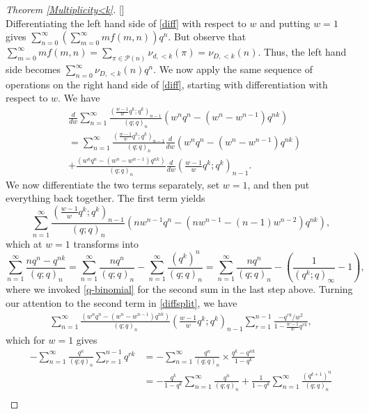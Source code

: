 \documentclass[12pt,reqno]{amsart}
\renewcommand{\(}{\left\(}
\renewcommand{\)}{\right\)}
\renewcommand{\[}{\left\[}
\renewcommand{\]}{\right\]}
\numberwithin{equation}{section}
\theoremstyle{plain}
\begin{document}
\begin{proof}[Theorem \textup{\ref{Multiplicity<k}}][]
\begin{equation}
\end{equation}
Differentiating the left hand side of \eqref{diff} with respect to $w$ and putting $w=1$ gives $\sum_{n=0}^{\infty} \left(\sum_{m=0}^{\infty} m f(m, n) \right)q^n$. But observe that $\sum_{m=0}^{\infty} m f(m, n) = \sum_{\pi \in \mathcal{P}(n)}\nu_{d,<k}(\pi) =  \nu_{D,<k}(n)$. Thus, the left hand side becomes $\sum_{n=0}^{\infty}\nu_{D,<k}(n)q^n$. We now apply the same sequence of operations on the right hand side of \eqref{diff}, starting with differentiation with respect to $w$. We have
\begin{align}
& \frac{d}{dw}  \sum_{n=1}^{\infty}\frac{(\frac{w-1}{w}q^k;q^k)_{n-1}}{(q;q)_n}\left(w^n q^n- (w^n - w^{n-1})q^{nk}\right) \nonumber \\
&=   \sum_{n=1}^{\infty} \frac{(\frac{w-1}{w}q^k;q^k)_{n-1}}{(q; q)_n} \frac{d}{dw} (w^n q^n- (w^n - w^{n-1})q^{nk}) \nonumber\\
&+ \frac{(w^n q^n- (w^n - w^{n-1})q^{nk})}{(q; q)_n} \frac{d}{dw} \left(\frac{w-1}{w}q^k;q^k \right)_{n-1}. \label{diffsplit}
\end{align}
We now differentiate the two terms separately, set $w=1$, and then put everything back together. The first term yields
\begin{equation*}
 \sum_{n=1}^{\infty} \frac{(\frac{w-1}{w}q^k;q^k)_{n-1}}{(q; q)_n} (n w^{n-1} q^n- (n w^{n-1} - (n-1)w^{n-2})q^{nk}),
\end{equation*} 
which at $w=1$ transforms into
\begin{equation}\label{first term}
 \sum_{n=1}^{\infty}\frac{nq^n - q^{nk}}{(q; q)_n} =  \sum_{n=1}^{\infty} \frac{nq^n}{(q; q)_n} -  \sum_{n=1}^{\infty} \frac{(q^k)^n}{(q; q)_n} =  \sum_{n=1}^{\infty} \frac{nq^n}{(q; q)_n} - \left( \frac{1}{(q^k; q)_{\infty}} - 1\right),
\end{equation}
where we invoked \eqref{q-binomial} for the second sum in the last step above. Turning our attention to the second term in \eqref{diffsplit}, we have
\begin{align*}
 \sum_{n=1}^{\infty} \frac{(w^n q^n- (w^n - w^{n-1})q^{nk})}{(q; q)_n} \left(\frac{w-1}{w}q^k;q^k \right)_{n-1} \sum_{r=1}^{n-1}\frac{-q^{rk}/w^2}{1 - \frac{w-1}{w}q^{rk}},
\end{align*}
which for $w=1$ gives
\begin{align}
-  \sum_{n=1}^{\infty}  \frac{q^n}{(q; q)_n} \sum_{r=1}^{n-1}q^{rk} &= - \sum_{n=1}^{\infty} \frac{q^n}{(q; q)_n} \times \frac{q^k - q^{nk}}{1 - q^k} \nonumber\\
& = -\frac{q^k}{1 - q^k}\sum_{n=1}^{\infty} \frac{q^n}{(q; q)_n} + \frac{1}{1 - q^k} \sum_{n=1}^{\infty} \frac{(q^{k+1})^n}{(q; q)_n} \nonumber\\

\end{align}
\end{proof}
\end{document}
